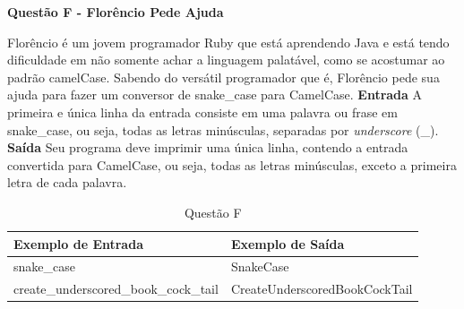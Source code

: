 \documentclass[a4paper, 12pt]{article}
\begin{document}
\newpage %
\begin{center}
\textbf{{\Large Questão F - Florêncio Pede Ajuda}}
\end{center}
\vspace{5pt}
Florêncio é um jovem programador Ruby que está aprendendo Java e está
tendo dificuldade em não somente achar a linguagem palatável, como se
acostumar ao padrão camelCase. \newline \newline
Sabendo do versátil programador que é, Florêncio pede sua ajuda para fazer
um conversor de snake\_case para CamelCase.
\newline \newline
\textbf{{\large Entrada}} \newline
A primeira e única linha da entrada consiste em uma palavra ou frase em
snake\_case, ou seja, todas as letras minúsculas, separadas por \textit{underscore}
(\_).
\newline \newline
\textbf{{\large Saída}} \newline
Seu programa deve imprimir uma única linha, contendo a entrada convertida
para CamelCase, ou seja, todas as letras minúsculas, exceto a primeira letra
de cada palavra.
\newline
\begin{table}[H]
\centering
\begin{tabular}{|l|l|}
\hline
\textbf{Exemplo de Entrada}           & \textbf{Exemplo de Saída}     \\ \hline
snake\_case                           & SnakeCase                     \\ \hline
create\_underscored\_book\_cock\_tail & CreateUnderscoredBookCockTail \\ \hline
\end{tabular}
\caption{Questão F}
\label{tabela6}
\end{table}
\end{document}

